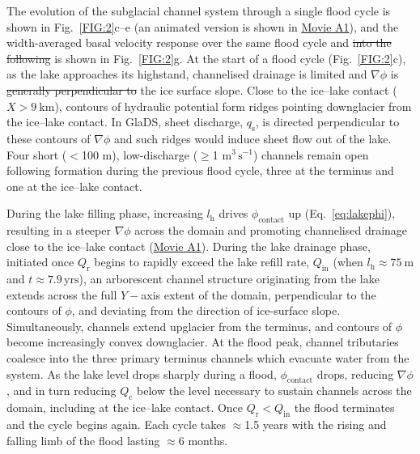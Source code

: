 \documentclass[tc, manuscript]{copernicus}
\providecommand{\DIFadd}[1]{{\protect\color{blue}\uwave{#1}}} %
\providecommand{\DIFdel}[1]{{\protect\color{red}\sout{#1}}} %
\providecommand{\DIFaddbegin}{} %
\providecommand{\DIFaddend}{} %
\providecommand{\DIFdelbegin}{} %
\providecommand{\DIFdelend}{} %
\begin{document}
The evolution of the subglacial channel system through a single flood cycle is shown in Fig.~\ref{FIG:2}c--e (an animated version is shown in \hyperref[Apfig:SuppMovie]{Movie A1}), and the width-averaged basal velocity response over the same flood cycle and \DIFdelbegin \DIFdel{into the following }\DIFdelend \DIFaddbegin \DIFadd{the following one }\DIFaddend is shown in Fig.~\ref{FIG:2}g. At the start of a flood cycle (Fig.~\ref{FIG:2}c), as the lake approaches its highstand, channelised drainage is limited and $\nabla\phi$ is \DIFdelbegin \DIFdel{generally perpendicular to }\DIFdelend \DIFaddbegin \DIFadd{controlled by }\DIFaddend the ice surface slope. Close to the ice--lake contact ($X > \mathrm{9\ km}$), contours of hydraulic potential form ridges pointing downglacier from the ice--lake contact. In GlaDS, sheet discharge, \DIFdelbegin \DIFdel{$q_{\mathrm{s}}$}\DIFdelend \DIFaddbegin \DIFadd{$\mathbf{q}_{\mathrm{s}}$}\DIFaddend , is directed perpendicular to these contours of $\nabla\phi$ and such ridges would induce sheet flow out of the lake. Four short ($<$100 m), low-discharge ($\geq$1 m$^{3}\,\mathrm{s}^{-1}$) channels remain open following formation during the previous flood cycle, three at the terminus and one at the ice--lake contact.

During the lake filling phase, increasing $l_\mathrm{{h}}$ drives $\phi_{\mathrm{contact}}$ up (Eq.~\ref{eq:lakephi}), resulting in a steeper $\nabla \phi$ across the domain and promoting channelised drainage close to the ice--lake contact (\hyperref[Apfig:SuppMovie]{Movie A1}). During the lake drainage phase, initiated once $Q_{\mathrm{r}}$ begins to rapidly exceed the lake refill rate, $Q_{\mathrm{in}}$ (when $l_\mathrm{{h}} \approx \mathrm{75\ m}$ and $t \approx \mathrm{7.9 \, yrs}$), an arborescent channel structure originating from the lake extends across the full $Y-$axis extent of the domain, perpendicular to the contours of $\phi$, and deviating from the direction of ice-surface slope. Simultaneously, channels extend upglacier from the terminus, and contours of $\phi$ become increasingly convex downglacier. At the flood peak, channel tributaries coalesce into the three primary terminus channels which evacuate water from the system. As the lake level drops sharply during a flood, $\phi_{\mathrm{contact}}$ drops, reducing $\nabla \phi$, and in turn reducing $Q_{\mathrm{c}}$ below the level necessary to sustain channels across the domain, including at the ice--lake contact. Once $Q_{\mathrm{r}} < Q_{\mathrm{in}}$ the flood terminates and the cycle begins again. Each cycle takes $\approx$1.5 years with the rising and falling limb of the flood lasting $\approx$6 months. 
\end{document}

